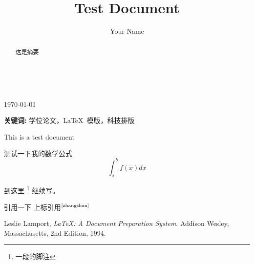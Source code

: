 \documentclass[a4paper,11pt,twoside,openany]{article}
\newcommand{\upcite}[1]{$^{\mbox{\scriptsize \cite{#1}}}$}%
\begin{document}
\tableofcontents
\thispagestyle{empty} 　　　%
\author{Your Name}
\title{Test Document}
\maketitle
\today %
\begin{abstract}
这是摘要
\end{abstract}
\vfill %
\textbf{关键词:} 学位论文，\LaTeX\ 模版，科技排版


This is a test document
\newline %

测试一下我的数学公式\[\int_a^b f(x)dx\]

到这里
\footnote{一段的脚注}
继续写。
\par
引用一下\cite{zhangshan}
上标引用\upcite{zhangshan}
\begin{thebibliography}{9}
Leslie Lamport,
\emph{\LaTeX: A Document Preparation System}.
Addison Wesley, Massachusetts,
2nd Edition,
1994.
\end{thebibliography}
\end{document}

